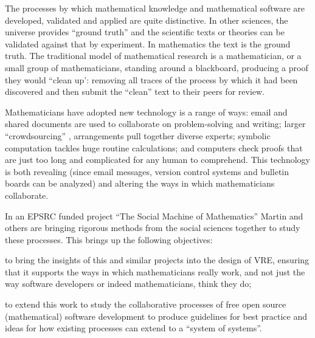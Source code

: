 \begin{workpackage}[id=social-aspects,wphases=0-48,
  title=Social Aspects,
  lead=UO,
  UORM=23,USHRM=8,USORM=6] 


\begin{wpobjectives}

The processes by which mathematical knowledge and mathematical
software are developed, validated and applied are quite
distinctive. In other sciences, the universe provides ``ground truth''
and the scientific texts or theories can be validated against that by
experiment. In mathematics the text is the ground truth. The
traditional model of mathematical research is a mathematician, or a
small group of mathematicians, standing around a blackboard, producing
a proof they would ``clean up': removing all traces of the process
by which it had been discovered and then submit the ``clean'' text to
their peers for review.

Mathematicians have adopted new technology is a range of ways: email
and shared documents are used to collaborate on problem-solving and
writing; larger ``crowdsourcing'' \cite{polymath_SIAM, PolymathBlog},
arrangements pull together diverse experts; symbolic computation
tackles huge routine calculations; and computers check proofs that are
just too long and complicated for any human to comprehend. This
technology is both revealing (since email messages, version control
systems and bulletin boards can be analyzed) and altering the ways in
which mathematicians collaborate.

In an EPSRC funded project ``The Social Machine of Mathematics''
Martin and others are bringing rigorous methods from the social 
sciences together to study these processes. This brings up the following
objectives: 
\begin{compactitem}
\item to bring the insights of this and similar projects into the
  design of \TheProject VRE, ensuring that it supports the ways in
  which mathematicians really work, and not just the way software
  developers or indeed mathematicians, think they do;
\item to extend this work to study the collaborative processes of free
  open source (mathematical) software development to produce
  guidelines for best practice and ideas for how existing processes
  can extend to a ``system of systems''.
\end{compactitem} 
\end{wpobjectives}


\end{workpackage}
